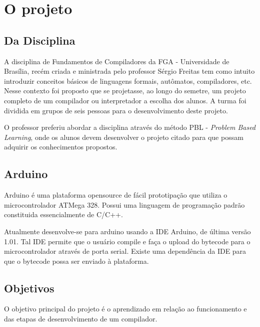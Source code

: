 \documentclass{abnt}
\begin{document}

\capa
\folhaderosto
\sumario

\chapter{O projeto}
    \section{Da Disciplina}
    A disciplina de Fundamentos de Compiladores da FGA - Universidade de Brasília, recém criada e ministrada pelo professor Sérgio Freitas tem como intuito introduzir conceitos básicos de linguagens formais, autômatos, compiladores, etc. Nesse contexto foi proposto que se projetasse, ao longo do semetre, um projeto completo de um compilador ou interpretador a escolha dos alunos. A turma foi dividida em grupos de seis pessoas para o desenvolvimento deste projeto.

    O professor preferiu abordar a disciplina através do método PBL - \textit{Problem Based Learning}, onde os alunos devem desenvolver o projeto citado para que possam adquirir os conhecimentos propostos.

\section{Arduino}
Arduino é uma plataforma opensource de fácil prototipação que utiliza o microcontrolador ATMega 328. Possui uma linguagem de programação padrão constituida essencialmente de C/C++.

Atualmente desenvolve-se para arduino usando a IDE Arduino, de última versão 1.01. Tal IDE permite que o usuário compile e faça o upload do bytecode para o microcontrolador através de porta serial. Existe uma dependência da IDE para que o bytecode possa ser enviado à plataforma.

    \section{Objetivos}

    O objetivo principal do projeto é o aprendizado em relação ao funcionamento e das etapas de desenvolvimento de um compilador.
\end{document}
